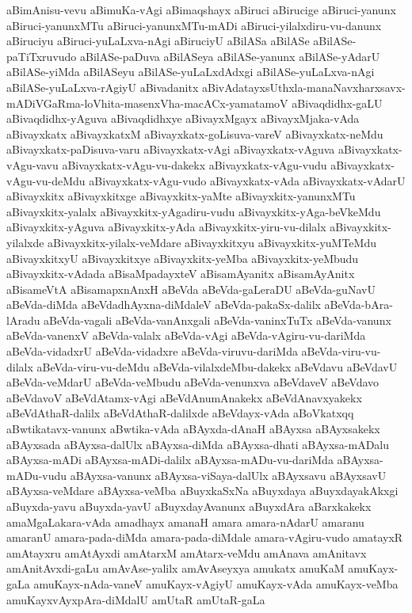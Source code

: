 {aBimAnisu-vevu
aBimuKa-vAgi
aBimaqshayx
aBiruci
aBirucige
aBiruci-yanunx
aBiruci-yanunxMTu
aBiruci-yanunxMTu-mADi
aBiruci-yilalxdiru-vu-danunx
aBiruciyu
aBiruci-yuLaLxva-nAgi
aBiruciyU
aBilASa
aBilASe
aBilASe-paTiTxruvudo
aBilASe-paDuva
aBilASeya
aBilASe-yanunx
aBilASe-yAdarU
aBilASe-yiMda
aBilASeyu
aBilASe-yuLaLxdAdxgi
aBilASe-yuLaLxva-nAgi
aBilASe-yuLaLxva-rAgiyU
aBivadanitx
aBivAdatayxsUthxla-manaNavxharxsavx-mADiVGaRma-loVhita-masenxVha-macACx-yamatamoV
aBivaqdidhx-gaLU
aBivaqdidhx-yAguva
aBivaqdidhxye
aBivayxMgayx
aBivayxMjaka-vAda
aBivayxkatx
aBivayxkatxM
aBivayxkatx-goLisuva-vareV
aBivayxkatx-neMdu
aBivayxkatx-paDisuva-varu
aBivayxkatx-vAgi
aBivayxkatx-vAguva
aBivayxkatx-vAgu-vavu
aBivayxkatx-vAgu-vu-dakekx
aBivayxkatx-vAgu-vudu
aBivayxkatx-vAgu-vu-deMdu
aBivayxkatx-vAgu-vudo
aBivayxkatx-vAda
aBivayxkatx-vAdarU
aBivayxkitx
aBivayxkitxge
aBivayxkitx-yaMte
aBivayxkitx-yanunxMTu
aBivayxkitx-yalalx
aBivayxkitx-yAgadiru-vudu
aBivayxkitx-yAga-beVkeMdu
aBivayxkitx-yAguva
aBivayxkitx-yAda
aBivayxkitx-yiru-vu-dilalx
aBivayxkitx-yilalxde
aBivayxkitx-yilalx-veMdare
aBivayxkitxyu
aBivayxkitx-yuMTeMdu
aBivayxkitxyU
aBivayxkitxye
aBivayxkitx-yeMba
aBivayxkitx-yeMbudu
aBivayxkitx-vAdada
aBisaMpadayxteV
aBisamAyanitx
aBisamAyAnitx
aBisameVtA
aBisamapxnAnxH
aBeVda
aBeVda-gaLeraDU
aBeVda-guNavU
aBeVda-diMda
aBeVdadhAyxna-diMdaleV
aBeVda-pakaSx-dalilx
aBeVda-bAra-lAradu
aBeVda-vagali
aBeVda-vanAnxgali
aBeVda-vaninxTuTx
aBeVda-vanunx
aBeVda-vanenxV
aBeVda-valalx
aBeVda-vAgi
aBeVda-vAgiru-vu-dariMda
aBeVda-vidadxrU
aBeVda-vidadxre
aBeVda-viruvu-dariMda
aBeVda-viru-vu-dilalx
aBeVda-viru-vu-deMdu
aBeVda-vilalxdeMbu-dakekx
aBeVdavu
aBeVdavU
aBeVda-veMdarU
aBeVda-veMbudu
aBeVda-venunxva
aBeVdaveV
aBeVdavo
aBeVdavoV
aBeVdAtamx-vAgi
aBeVdAnumAnakekx
aBeVdAnavxyakekx
aBeVdAthaR-dalilx
aBeVdAthaR-dalilxde
aBeVdayx-vAda
aBoVkatxqq
aBwtikatavx-vanunx
aBwtika-vAda
aBAyxda-dAnaH
aBAyxsa
aBAyxsakekx
aBAyxsada
aBAyxsa-dalUlx
aBAyxsa-diMda
aBAyxsa-dhati
aBAyxsa-mADalu
aBAyxsa-mADi
aBAyxsa-mADi-dalilx
aBAyxsa-mADu-vu-dariMda
aBAyxsa-mADu-vudu
aBAyxsa-vanunx
aBAyxsa-viSaya-dalUlx
aBAyxsavu
aBAyxsavU
aBAyxsa-veMdare
aBAyxsa-veMba
aBuyxkaSxNa
aBuyxdaya
aBuyxdayakAkxgi
aBuyxda-yavu
aBuyxda-yavU
aBuyxdayAvanunx
aBuyxdAra
aBarxkakekx
amaMgaLakara-vAda
amadhayx
amanaH
amara
amara-nAdarU
amaranu
amaranU
amara-pada-diMda
amara-pada-diMdale
amara-vAgiru-vudo
amatayxR
amAtayxru
amAtAyxdi
amAtarxM
amAtarx-veMdu
amAnava
amAnitavx
amAnitAvxdi-gaLu
amAvAse-yalilx
amAvAseyxya
amukatx
amuKaM
amuKayx-gaLa
amuKayx-nAda-vaneV
amuKayx-vAgiyU
amuKayx-vAda
amuKayx-veMba
amuKayxvAyxpAra-diMdalU
amUtaR
amUtaR-gaLa
}
